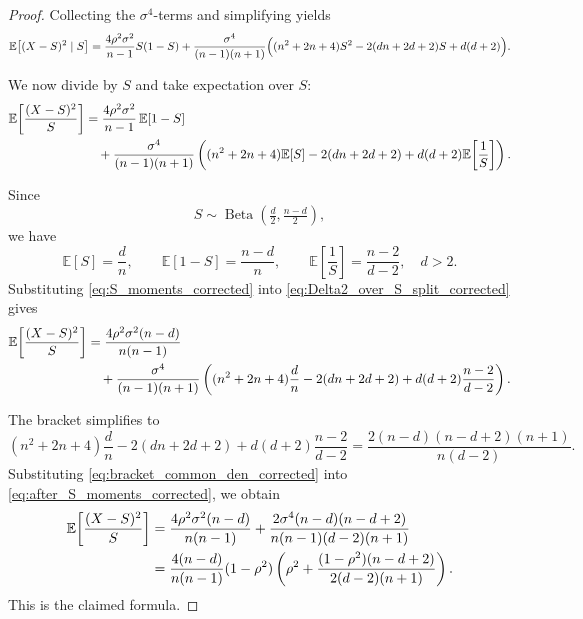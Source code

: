 \documentclass{article}
\DeclareMathOperator{\BetaDist}{Beta}
\begin{document}
\begin{proof}
Collecting the $\sigma^4$-terms and simplifying yields
\begin{equation}
\mathbb E\big[(X-S)^2\mid S\big]
=
\frac{4\rho^2\sigma^2}{n-1}S(1-S)
+
\frac{\sigma^4}{(n-1)(n+1)}
\Bigl((n^2+2n+4)S^2-2(dn+2d+2)S+d(d+2)\Bigr).
\label{eq:cond_second_moment_compact_corrected}
\end{equation}

We now divide by $S$ and take expectation over $S$:
\begin{align}
\mathbb E\!\left[\frac{(X-S)^2}{S}\right]
&=
\frac{4\rho^2\sigma^2}{n-1}\,\mathbb E[1-S]
\notag\\
&\quad
+
\frac{\sigma^4}{(n-1)(n+1)}
\left(
(n^2+2n+4)\mathbb E[S]
-2(dn+2d+2)
+d(d+2)\mathbb E\!\left[\frac1S\right]
\right).
\label{eq:Delta2_over_S_split_corrected}
\end{align}

Since
\[
S\sim \BetaDist\!\left(\tfrac d2,\tfrac{n-d}{2}\right),
\]
we have
\begin{equation}
\mathbb E[S]=\frac{d}{n},
\qquad
\mathbb E[1-S]=\frac{n-d}{n},
\qquad
\mathbb E\!\left[\frac1S\right]=\frac{n-2}{d-2},
\quad d>2.
\label{eq:S_moments_corrected}
\end{equation}
Substituting \eqref{eq:S_moments_corrected} into \eqref{eq:Delta2_over_S_split_corrected} gives
\begin{align}
\mathbb E\!\left[\frac{(X-S)^2}{S}\right]
&=
\frac{4\rho^2\sigma^2(n-d)}{n(n-1)}
\notag\\
&\quad
+
\frac{\sigma^4}{(n-1)(n+1)}
\left(
(n^2+2n+4)\frac dn
-2(dn+2d+2)
+d(d+2)\frac{n-2}{d-2}
\right).
\label{eq:after_S_moments_corrected}
\end{align}

The bracket simplifies to
\begin{equation}
(n^2+2n+4)\frac dn
-2(dn+2d+2)
+d(d+2)\frac{n-2}{d-2}
=
\frac{2(n-d)(n-d+2)(n+1)}{n(d-2)}.
\label{eq:bracket_common_den_corrected}
\end{equation}
Substituting \eqref{eq:bracket_common_den_corrected} into \eqref{eq:after_S_moments_corrected}, we obtain
\begin{align}
\mathbb E\!\left[\frac{(X-S)^2}{S}\right]
&=
\frac{4\rho^2\sigma^2(n-d)}{n(n-1)}
+
\frac{2\sigma^4(n-d)(n-d+2)}{n(n-1)(d-2)(n+1)}
\notag\\
&=
\frac{4(n-d)}{n(n-1)}(1-\rho^2)
\left(
\rho^2+\frac{(1-\rho^2)(n-d+2)}{2(d-2)(n+1)}
\right).
\label{eq:almost_done_corrected}
\end{align}
This is the claimed formula.
\end{proof}
\end{document}
